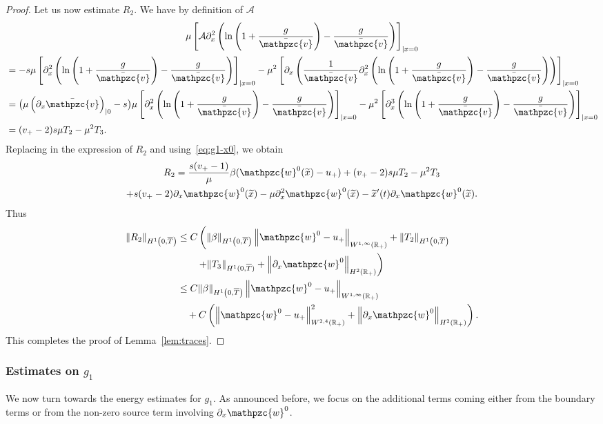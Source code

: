 \documentclass[AHL,Unicode,longabstracts,published]{cedram}
\newcommand{\R}{\mathbb{R}}
\newcommand{\p}{\partial}
\newcommand{\bv}{\bar{\mathpzc{v}}}
\newcommand{\cA}{\mathcal A}
\newcommand{\tw}{\mathpzc{w}}
\newcommand{\tx}{\widetilde{x}}
\newcommand{\tx}{\widetilde{x}}
\begin{document}
\begin{proof}
Let us now estimate $R_2$. We have by definition of $\cA$
\begin{multline*}
 \mu \left[\cA \partial^2_x \left(\ln \left(1+ \frac{g}{\bv}\right) - \frac{g}{\bv} \right) \right]_{|x=0} \\
\begin{aligned}
& = -s \mu \left[\partial^2_x \left(\ln \left(1+ \frac{g}{\bv}\right) - \frac{g}{\bv} \right) \right]_{|x=0} - \mu^2 \left[\partial_x \left(\frac{1}{\bv} \partial^2_x \left(\ln \left(1+ \frac{g}{\bv}\right) - \frac{g}{\bv} \right) \right)\right]_{|x=0}\\
& = \big(\mu\left(\partial_x \bv\right)_{|0}-s\big) \mu \left[\partial^2_x \left(\ln \left(1+ \frac{g}{\bv}\right) - \frac{g}{\bv} \right) \right]_{|x=0} - \mu^2 \left[\partial^3_x \left(\ln \left(1+ \frac{g}{\bv}\right) - \frac{g}{\bv} \right)\right]_{|x=0}\\
& = (v_+-2) s \mu T_2 - \mu^2 T_3.
\end{aligned}
\end{multline*}
Replacing in the expression of $R_2$ and using~\eqref{eq:g1-x0}, we obtain
\begin{multline*}
R_2=\frac{s(v_+-1)}{\mu} \beta (\tw^0(\tx)-u_+) + (v_+-2) s \mu T_2 - \mu^2 T_3\\
+ s (v_+-2) \partial_x \tw^0(\tx) - \mu \partial^2_x \tw^0(\tx) - \tx'(t) \partial_x \tw^0(\tx).
\end{multline*}
Thus
\begin{align*}
\|R_2\|_{H^1\left(0,\overline{T}\right)} &\leq C \left(\|\beta\|_{H^1\left(0, \overline{T}\right)}\left\|\tw^0-u_+\right\|_{W^{1,\infty}(\R_+)} + \|T_2\|_{H^1\left(0, \overline{T}\right)} \right.\\
&\left. \qquad+ \|T_3\|_{H^1(0, \overline{T})} + \left\|\p_x \tw^0\right\|_{H^2(\R_+)}\right)\\
&\leq C \|\beta\|_{H^1\left(0, \overline{T}\right)}\left\|\tw^0-u_+\right\|_{W^{1,\infty}(\R_+)} \\
&\quad+C \left(\left\| \tw^0-u_+\right\|_{W^{2,4}(\R_+)}^2 + \left\|\p_x \tw^0\right\|_{H^2(\R_+)} \right).
\end{align*}
This completes the proof of Lemma~\ref{lem:traces}.
\end{proof}


\subsubsection{Estimates on $g_1$}
We now turn towards the energy estimates for $g_1$. As announced before, we focus on the additional terms coming either from the boundary terms or from the non-zero source term involving $\p_x \tw^0$.
\end{document}
